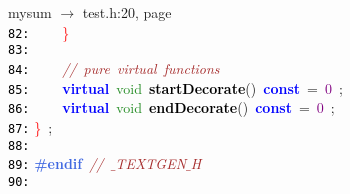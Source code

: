 \documentclass{article}
\begin{document}
\mbox{}{\hfill mysum $\rightarrow$ test.h:20, page~\pageref{test.h:20}} \\
\mbox{}\texttt{\textcolor{Black}{82:}} \ \ \ \ \textcolor{Red}{\}} \\
\mbox{}\texttt{\textcolor{Black}{83:}}  \\
\mbox{}\texttt{\textcolor{Black}{84:}} \ \ \ \ \textit{\textcolor{Brown}{//\ pure\ virtual\ functions}} \\
\mbox{}\texttt{\textcolor{Black}{85:}} \ \ \ \ \textbf{\textcolor{Blue}{virtual}}\ \textcolor{ForestGreen}{void}\ \textbf{\textcolor{Black}{startDecorate}}\textcolor{BrickRed}{()}\ \textbf{\textcolor{Blue}{const}}\ \textcolor{BrickRed}{=}\ \textcolor{Purple}{0}\ \textcolor{BrickRed}{;} \\
\mbox{}\texttt{\textcolor{Black}{86:}} \ \ \ \ \textbf{\textcolor{Blue}{virtual}}\ \textcolor{ForestGreen}{void}\ \textbf{\textcolor{Black}{endDecorate}}\textcolor{BrickRed}{()}\ \textbf{\textcolor{Blue}{const}}\ \textcolor{BrickRed}{=}\ \textcolor{Purple}{0}\ \textcolor{BrickRed}{;} \\
\mbox{}\texttt{\textcolor{Black}{87:}} \textcolor{Red}{\}}\ \textcolor{BrickRed}{;} \\
\mbox{}\texttt{\textcolor{Black}{88:}}  \\
\mbox{}\texttt{\textcolor{Black}{89:}} \textbf{\textcolor{RoyalBlue}{\#endif}}\ \textit{\textcolor{Brown}{//\ $\_$TEXTGEN$\_$H}} \\
\mbox{}\texttt{\textcolor{Black}{90:}} 
\end{document}
